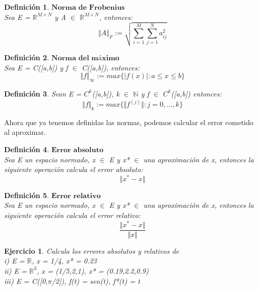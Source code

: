 \documentclass[10pt, a4paper]{article}
\theoremstyle{theorem-style}
\theoremstyle{definition-style}
\newtheorem{ndef}{Definición}[section]
\theoremstyle{remark-style}
\theoremstyle{example-style}
\theoremstyle{definition-style}
\newtheorem{ejer}{Ejercicio}[section]
\theoremstyle{remark-style}
\begin{document}
\begin{ndef}
$\textbf{Norma de Frobenius}$\\
Sea E = $\mathbb{R}^{M \times N}$ y A $\in$ $\mathbb{R}^{M \times N}$, entonces:
\[ \Vert A \Vert _F := \sqrt{\sum_{i=1}^{M} \sum_{j=1}^{N} a_{ij}^2} \]
\end{ndef}

\begin{ndef}
$\textbf{Norma del máximo}$\\
Sea E = C([a,b]) y f $\in$ C([a,b]), entonces:
\[ \Vert f \Vert _\infty := max\lbrace \vert f(x) \vert : a \leq x \leq b \rbrace \]
\end{ndef}

\begin{ndef}
Sean E = $C^k$([a,b]), k $\in$ $\mathbb{N}$ y f $\in$ $C^k$([a,b]) entonces:
\[ \Vert f \Vert _k := max\lbrace \Vert f^{(j)} \Vert : j = 0,...,k \rbrace \]
\end{ndef}

Ahora que ya tenemos definidas las normas, podemos calcular el error cometido al aproximar.

\begin{ndef}
$\textbf{Error absoluto}$\\
Sea E un espacio normado, x $\in$ E y x* $\in$ una aproximación de x, entonces la siguiente operación calcula el error absoluto:
\[ \Vert x^* - x \Vert \]
\end{ndef}

\begin{ndef}
$\textbf{Error relativo}$\\
Sea E un espacio normado, x $\in$ E y x* $\in$ una aproximación de x, entonces la siguiente operación calcula el error relativo:
\[  \frac {\Vert x^* - x \Vert}{ \Vert x \Vert} \]
\end{ndef}

\begin{ejer}
Calcula los errores absolutos y relativos de\\
i) E = $\mathbb{R}$, x = 1/4, x* = 0.23\\
ii) E = $\mathbb{R}^3$, x = (1/5,2,1), x* = (0.19,2.2,0.9)\\
iii) E = C([0,$\pi$/2]), f(t) = sen(t), f*(t) = t
\end{ejer}
\end{document}
